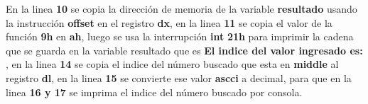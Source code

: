 \documentclass[a4paper,twoside]{article}
\newcommand{\codebordo}[1]{\textcolor{codebordo}{#1}}
\newcommand{\codeblue}[1]{\textcolor{codeblue}{#1}}
\newcommand{\codepurple}[1]{\textcolor{codepurple}{#1}}
\begin{document}
 {
   \Large En la linea \textbf{10} se copia la dirección de memoria de la variable \textbf{resultado} usando la instrucción \codeblue{\textbf{offset}} en el registro
  \codebordo{\textbf{dx}}, en la linea \textbf{11} se copia el valor de la función \textbf{9h} en \codebordo{\textbf{ah}}, luego se usa la interrupción 
  \codeblue{\textbf{int}} \textbf{21h} para imprimir la cadena que se guarda en la variable resultado que es \codepurple{\textbf{El indice del valor ingresado es: }},
  en la linea \textbf{14} se copia el indice del número buscado que esta en \textbf{middle} al registro \codebordo{\textbf{dl}}, en la linea \textbf{15} se convierte 
  ese valor \textbf{ascci} a decimal, para que en la linea \textbf{16 y 17} se imprima el indice del número buscado por consola.
 }
\end{document}
